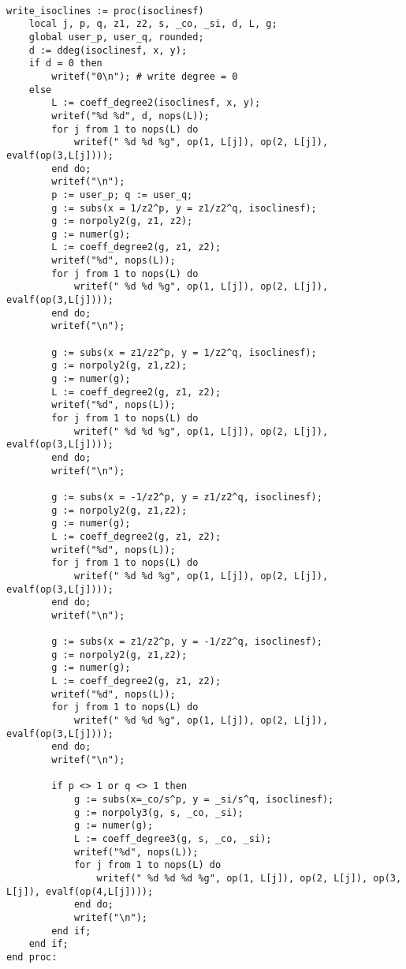 \documentclass[a4paper,10pt]{article}
\begin{document}
\begin{lstlisting}[name=writelog3]

write_isoclines := proc(isoclinesf)
    local j, p, q, z1, z2, s, _co, _si, d, L, g;
    global user_p, user_q, rounded;
    d := ddeg(isoclinesf, x, y);
    if d = 0 then
        writef("0\n"); # write degree = 0
    else
        L := coeff_degree2(isoclinesf, x, y);
        writef("%d %d", d, nops(L));
        for j from 1 to nops(L) do
            writef(" %d %d %g", op(1, L[j]), op(2, L[j]), evalf(op(3,L[j])));
        end do;
        writef("\n");
        p := user_p; q := user_q;
        g := subs(x = 1/z2^p, y = z1/z2^q, isoclinesf);
        g := norpoly2(g, z1, z2);
        g := numer(g);
        L := coeff_degree2(g, z1, z2);
        writef("%d", nops(L));
        for j from 1 to nops(L) do
            writef(" %d %d %g", op(1, L[j]), op(2, L[j]), evalf(op(3,L[j])));
        end do;
        writef("\n");

        g := subs(x = z1/z2^p, y = 1/z2^q, isoclinesf);
        g := norpoly2(g, z1,z2);
        g := numer(g);
        L := coeff_degree2(g, z1, z2);
        writef("%d", nops(L));
        for j from 1 to nops(L) do
            writef(" %d %d %g", op(1, L[j]), op(2, L[j]), evalf(op(3,L[j])));
        end do;
        writef("\n");

        g := subs(x = -1/z2^p, y = z1/z2^q, isoclinesf);
        g := norpoly2(g, z1,z2);
        g := numer(g);
        L := coeff_degree2(g, z1, z2);
        writef("%d", nops(L));
        for j from 1 to nops(L) do
            writef(" %d %d %g", op(1, L[j]), op(2, L[j]), evalf(op(3,L[j])));
        end do;
        writef("\n");

        g := subs(x = z1/z2^p, y = -1/z2^q, isoclinesf);
        g := norpoly2(g, z1,z2);
        g := numer(g);
        L := coeff_degree2(g, z1, z2);
        writef("%d", nops(L));
        for j from 1 to nops(L) do
            writef(" %d %d %g", op(1, L[j]), op(2, L[j]), evalf(op(3,L[j])));
        end do;
        writef("\n");

        if p <> 1 or q <> 1 then
            g := subs(x=_co/s^p, y = _si/s^q, isoclinesf);
            g := norpoly3(g, s, _co, _si);
            g := numer(g);
            L := coeff_degree3(g, s, _co, _si);
            writef("%d", nops(L));
            for j from 1 to nops(L) do
                writef(" %d %d %d %g", op(1, L[j]), op(2, L[j]), op(3, L[j]), evalf(op(4,L[j])));
            end do;
            writef("\n");
        end if;
    end if;
end proc:
\end{lstlisting}
\end{document}
